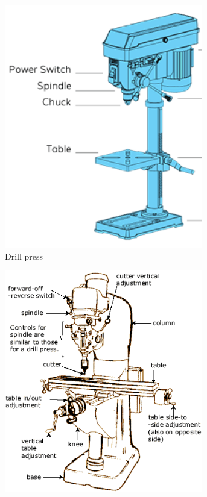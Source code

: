  \begin{figure}[H]
	\centering
	\begin{subfigure}[b]{.24\linewidth}
		\includegraphics[width=0.95\textwidth]{imgs/drillpress.png}
		\caption{Drill press}
	\end{subfigure}	\begin{subfigure}[b]{.34\linewidth}
		\includegraphics[width=0.95\textwidth]{imgs/mill.png}

\end{subfigure}
\end{figure}
